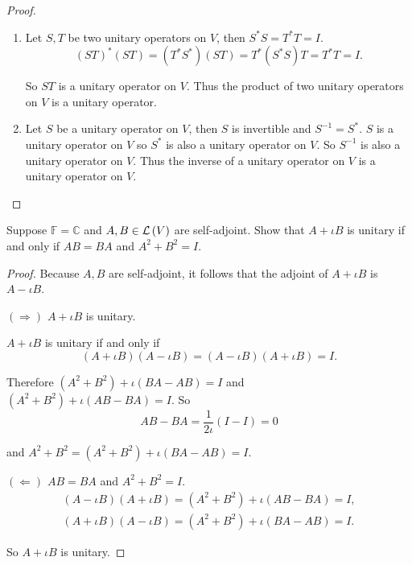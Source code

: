 \begin{proof}
    \begin{enumerate}[label={(\alph*)}]
        \item Let $S, T$ be two unitary operators on $V$, then $S^{*}S = T^{*}T = I$.
              \[
                  {(ST)}^{*}(ST) = (T^{*}S^{*})(ST) = T^{*}(S^{*}S)T = T^{*}T = I.
              \]

              So $ST$ is a unitary operator on $V$. Thus the product of two unitary operators on $V$ is a unitary operator.
        \item Let $S$ be a unitary operator on $V$, then $S$ is invertible and $S^{-1} = S^{*}$. $S$ is a unitary operator on $V$ so $S^{*}$ is also a unitary operator on $V$. So $S^{-1}$ is also a unitary operator on $V$. Thus the inverse of a unitary operator on $V$ is a unitary operator on $V$.
    \end{enumerate}
\end{proof}
\newpage

\begin{exercise}\label{chapter7:sectionD:exercise4}
    Suppose $\mathbb{F} = \mathbb{C}$ and $A, B \in \mathcal{L}\left({V}\right)$ are self-adjoint. Show that $A + \iota B$ is unitary if and only if $AB = BA$ and $A^{2} + B^{2} = I$.
\end{exercise}

\begin{proof}
    Because $A, B$ are self-adjoint, it follows that the adjoint of $A + \iota B$ is $A - \iota B$.

    $(\Rightarrow)$ $A + \iota B$ is unitary.

    $A + \iota B$ is unitary if and only if
    \[
        (A + \iota B)(A - \iota B) = (A - \iota B)(A + \iota B) = I.
    \]

    Therefore $(A^{2} + B^{2}) + \iota(BA - AB) = I$ and $(A^{2} + B^{2}) + \iota (AB - BA) = I$. So
    \[
        AB - BA = \frac{1}{2\iota}(I - I) = 0
    \]

    and $A^{2} + B^{2} = (A^{2} + B^{2}) + \iota(BA - AB) = I$.

    \bigskip
    $(\Leftarrow)$ $AB = BA$ and $A^{2} + B^{2} = I$.
    \[
        \begin{split}
            (A - \iota B)(A + \iota B) = (A^{2} + B^{2}) + \iota (AB - BA) = I, \\
            (A + \iota B)(A - \iota B) = (A^{2} + B^{2}) + \iota (BA - AB) = I.
        \end{split}
    \]

    So $A + \iota B$ is unitary.
\end{proof}
\newpage

